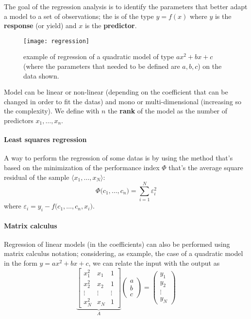	The goal of the regression analysis is to identify the parameters that better adapt a model to a set of observations; the  is of the type $y = f(x)$ where $y$ is the \textbf{response} (or yield) and $x$ is the \textbf{predictor}.
	
	\begin{SCfigure}[2][bht]
		\centering
		\texttt{[image: regression]}
		\caption{example of regression of a quadratic model of type $a x^2 + bx + c$ (where the parameters that needed to be defined are $a,b,c$) on the data shown.}
	\end{SCfigure}
	
	Model can be linear or non-linear (depending on the coefficient that can be changed in order to fit the datas) and mono or multi-dimensional (increasing so the complexity). We define with $n$ the \textbf{rank} of the model as the number of predictors $x_1,\dots, x_n$.
	
	\paragraph{Least squares regression} A way to perform the regression of some datas is by using the  method that's based on the minimization of the performance index $\Phi$ that's the average square residual of the sample $\big\langle x_1,\dots, x_N\big\rangle$:
	\[ \Phi\big(c_1,\dots, c_n\big) = \sum_{i=1}^N \varepsilon_i^2 \]
	where $\varepsilon_i = y_i - f\big(c_1,\dots, c_n, x_i\big)$.
	
	\paragraph{Matrix calculus} Regression of linear models (in the coefficients) can also be performed using matrix calculus notation; considering, as example, the case of a quadratic model in the form $y = ax^2 + bx + c$, we can relate the input with the output as
	\[ \underbrace{\begin{bmatrix}
			x_1^2 & x_1 & 1 \\
			x_2^2 & x_2 & 1 \\
			\vdots & \vdots & \vdots \\
			x_N^2 & x_N & 1 
	\end{bmatrix} }_A \begin{pmatrix}
		a\\b\\c
	\end{pmatrix} = \begin{pmatrix}
		y_1 \\ y_2 \\ \vdots \\ y_N
	\end{pmatrix}\]
	
